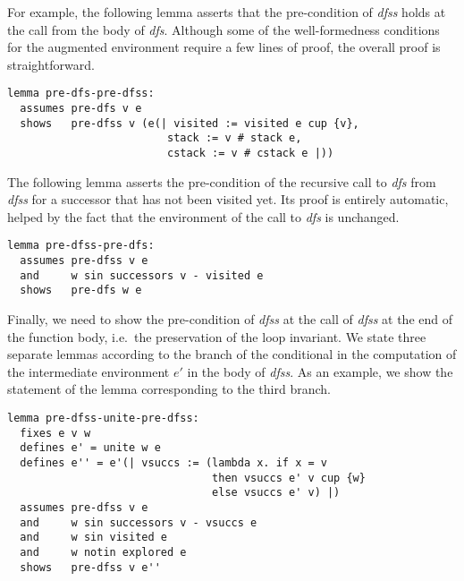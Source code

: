 \documentclass[sigplan,10pt,anonymous,review]{acmart}
\newcommand{\prog}[1]{\textit{#1}}
\begin{document}
For example, the following lemma asserts that the pre-condition of \prog{dfss} holds at the call from the body of \prog{dfs}. Although some of the well-formedness conditions for the augmented environment require a few lines of proof, the overall proof is straightforward.

\begin{small}
\begin{lstlisting}[language=isabelle]
lemma pre-dfs-pre-dfss:
  assumes pre-dfs v e
  shows   pre-dfss v (e(| visited := visited e cup {v},
                         stack := v # stack e,
                         cstack := v # cstack e |))
\end{lstlisting}
\end{small}

The following lemma asserts the pre-condition of the recursive call to \prog{dfs} from \prog{dfss} for a successor that has not been visited yet. Its proof is entirely automatic, helped by the fact that the environment of the call to \prog{dfs} is unchanged.

\begin{small}
\begin{lstlisting}[language=isabelle]
lemma pre-dfss-pre-dfs:
  assumes pre-dfss v e
  and     w sin successors v - visited e
  shows   pre-dfs w e
\end{lstlisting}
\end{small}

Finally, we need to show the pre-condition of \prog{dfss} at the call of \prog{dfss} at the end of the function body, i.e.\ the preservation of the loop invariant. We state three separate lemmas according to the branch of the conditional in the computation of the intermediate environment $e'$ in the body of \prog{dfss}. As an example, we show the statement of the lemma corresponding to the third branch.

\begin{small}
\begin{lstlisting}[language=isabelle]
lemma pre-dfss-unite-pre-dfss:
  fixes e v w
  defines e' = unite w e
  defines e'' = e'(| vsuccs := (lambda x. if x = v 
                                then vsuccs e' v cup {w}
                                else vsuccs e' v) |)
  assumes pre-dfss v e
  and     w sin successors v - vsuccs e
  and     w sin visited e
  and     w notin explored e
  shows   pre-dfss v e''
\end{lstlisting}
\end{small}
\end{document}
